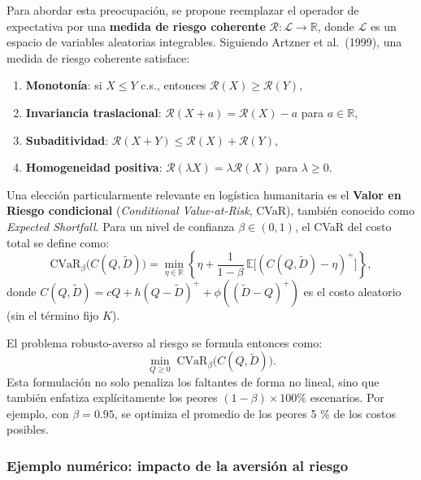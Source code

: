 \documentclass[
  spanish,
  us-letterpaper,
  DIV=11,
  numbers=noendperiod]{scrreprt}
\providecommand{\tightlist}{%
  \setlength{\itemsep}{0pt}\setlength{\parskip}{0pt}}
\numberwithin{equation}{section}
\begin{document}
Para abordar esta preocupación, se propone reemplazar el operador de
expectativa por una \textbf{medida de riesgo coherente}
\(\mathcal{R}: \mathcal{L} \to \mathbb{R}\), donde \(\mathcal{L}\) es un
espacio de variables aleatorias integrables. Siguiendo Artzner et
al.~(1999), una medida de riesgo coherente satisface:

\begin{enumerate}
\def\labelenumi{\arabic{enumi}.}
\tightlist
\item
  \textbf{Monotonía}: si \(X \leq Y\) c.s., entonces
  \(\mathcal{R}(X) \geq \mathcal{R}(Y)\),\\
\item
  \textbf{Invariancia traslacional}:
  \(\mathcal{R}(X + a) = \mathcal{R}(X) - a\) para
  \(a \in \mathbb{R}\),\\
\item
  \textbf{Subaditividad}:
  \(\mathcal{R}(X + Y) \leq \mathcal{R}(X) + \mathcal{R}(Y)\),\\
\item
  \textbf{Homogeneidad positiva}:
  \(\mathcal{R}(\lambda X) = \lambda \mathcal{R}(X)\) para
  \(\lambda \geq 0\).
\end{enumerate}

Una elección particularmente relevante en logística humanitaria es el
\textbf{Valor en Riesgo condicional} (\emph{Conditional Value-at-Risk},
CVaR), también conocido como \emph{Expected Shortfall}. Para un nivel de
confianza \(\beta \in (0,1)\), el CVaR del costo total se define como:
\[
\text{CVaR}_\beta\big( C(Q, \tilde{D}) \big) = \min_{\eta \in \mathbb{R}} \left\{ \eta + \frac{1}{1 - \beta} \, \mathbb{E}\big[ (C(Q, \tilde{D}) - \eta)^+ \big] \right\},
\] donde
\(C(Q, \tilde{D}) = c Q + h (Q - \tilde{D})^+ + \phi((\tilde{D} - Q)^+)\)
es el costo aleatorio (sin el término fijo \(K\)).

El problema robusto-averso al riesgo se formula entonces como: \[
\min_{Q \geq 0} \; \text{CVaR}_\beta \big( C(Q, \tilde{D}) \big).
\] Esta formulación no solo penaliza los faltantes de forma no lineal,
sino que también enfatiza explícitamente los peores
\((1 - \beta) \times 100\%\) escenarios. Por ejemplo, con
\(\beta = 0.95\), se optimiza el promedio de los peores 5 \% de los
costos posibles.

\subsubsection{Ejemplo numérico: impacto de la aversión al
riesgo}\label{ejemplo-numuxe9rico-impacto-de-la-aversiuxf3n-al-riesgo}
\end{document}
